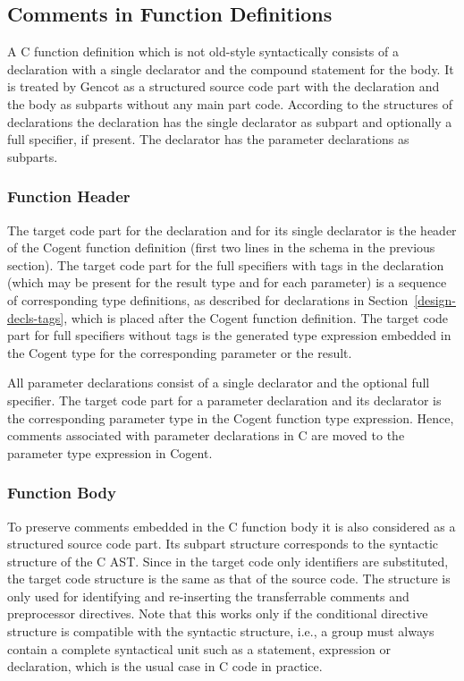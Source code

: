 \subsection{Comments in Function Definitions}

A C function definition which is not old-style syntactically consists of a declaration with a single declarator
and the compound statement for the body.
It is treated by Gencot as a structured source code part with the declaration and the body as subparts
without any main part code. According to the structures of declarations the declaration has the single declarator as subpart
and optionally a full specifier, if present. The declarator has the parameter declarations as subparts.

\subsubsection{Function Header}

The target code part for the declaration and for its single declarator is the header of the Cogent function definition
(first two lines in the schema in the previous section). The target code part for the full specifiers with tags in
the declaration (which may be present for the result type and for each parameter) is a sequence of corresponding 
type definitions, as described for declarations in Section~\ref{design-decls-tags}, which is placed 
after the Cogent function definition. The target code part for full specifiers without tags is the generated type
expression embedded in the Cogent type for the corresponding parameter or the result.

All parameter declarations consist of a single declarator and the optional full specifier. The target code part for
a parameter declaration and its declarator is the corresponding parameter type in the Cogent function type expression.
Hence, comments associated with parameter declarations in C are moved to the parameter type expression in Cogent.

\subsubsection{Function Body}

To preserve comments embedded in the C function body it is also considered as a structured source code part. Its 
subpart structure corresponds to the syntactic structure of the C AST. Since in the target code only identifiers 
are substituted, the target code
structure is the same as that of the source code. The structure is only used for identifying and re-inserting
the transferrable comments and preprocessor directives. Note that this works only if the conditional directive 
structure is compatible with the syntactic structure, i.e., a group must always contain a complete syntactical
unit such as a statement, expression or declaration, which is the usual case in C code in practice.

